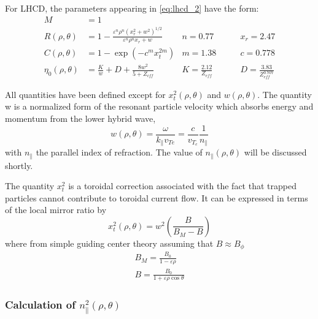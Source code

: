 For LHCD, the parameters appearing in \cref{eq:lhcd_2} have the form:
\begin{align}
	M &= 1 & &\qquad \\
	R ( \rho , \theta ) &= 1 - \frac { \varepsilon ^ { n } \rho ^ { n } \left( x _ { r } ^ { 2 } + w ^ { 2 } \right) ^ { 1 / 2 } } { \varepsilon ^ { n } \rho ^ { n } x _ { r } + w }  & n = 0.77 &\qquad x _ { r } = 2.47 \\
	C ( \rho , \theta ) &= 1 - \exp \left( - c ^ { m } x _ { t } ^ { 2 m } \right) & m = 1.38 &\qquad c = 0.778 \\
	\eta _ { 0 } ( \rho , \theta ) &= \frac { K } { w } + D + \frac { 8 w ^ { 2 } } { 5 + Z _ { c f f } } & K = \frac { 2.12 } { Z _ { eff } } &\qquad D = \frac { 3.83 } { Z _ { eff } ^ { 0.707 } }
\end{align}

All quantities have been defined except for $x_t^2(\rho,\theta)$ and $w(\rho,\theta)$. The quantity w is a normalized form of the resonant particle velocity which absorbs energy and momentum from the lower hybrid wave,
\begin{equation}
	w ( \rho , \theta ) = \frac { \omega } { k _ { \| } v _ { T e } } = \frac { c } { v _ { T _ { e } } } \frac { 1 } { n _ { \| } }
\end{equation}
with $n_\parallel$ the parallel index of refraction. The value of $n_\parallel(\rho,\theta)$ will be discussed shortly.

The quantity $x_t^2$ is a toroidal correction associated with the fact that trapped particles cannot contribute to toroidal current flow. It can be expressed in terms of the local mirror ratio by
\begin{equation}
	x _ { t } ^ { 2 } ( \rho , \theta ) = w ^ { 2 } \left( \frac { B } { B _ { M } - B } \right)
\end{equation}
where from simple guiding center theory assuming that $B \approx B_\phi$
\begin{gather}
	B _ { M } = \frac { B _ { 0 } } { 1 - \varepsilon \rho } \\
	B = \frac { B _ { 0 } } { 1 + \varepsilon \rho \cos \theta }
\end{gather}

\subsubsection{Calculation of $n_\parallel^2(\rho,\theta)$}


